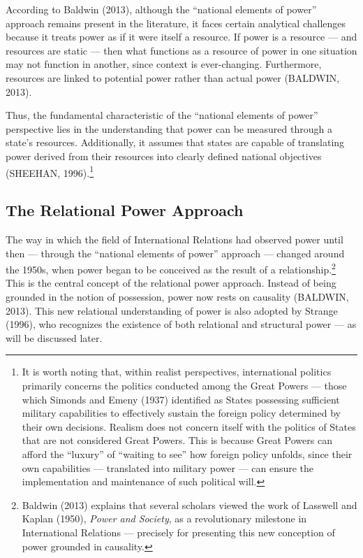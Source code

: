 According to Baldwin (2013), although the “national elements of power” approach remains present in the literature, it faces certain analytical challenges because it treats power as if it were itself a resource. If power is a resource — and resources are static — then what functions as a resource of power in one situation may not function in another, since context is ever-changing. Furthermore, resources are linked to potential power rather than actual power (BALDWIN, 2013).

Thus, the fundamental characteristic of the “national elements of power” perspective lies in the understanding that power can be measured through a state’s resources. Additionally, it assumes that states are capable of translating power derived from their resources into clearly defined national objectives (SHEEHAN, 1996).\footnote{It is worth noting that, within realist perspectives, international politics primarily concerns the politics conducted among the Great Powers --- those which Simonds and Emeny (1937) identified as States possessing sufficient military capabilities to effectively sustain the foreign policy determined by their own decisions. Realism does not concern itself with the politics of States that are not considered Great Powers. This is because Great Powers can afford the ``luxury'' of ``waiting to see'' how foreign policy unfolds, since their own capabilities --- translated into military power --- can ensure the implementation and maintenance of such political will.}


\subsection{The Relational Power Approach}

The way in which the field of International Relations had observed power until then --- through the ``national elements of power'' approach --- changed around the 1950s, when power began to be conceived as the result of a relationship.\footnote{Baldwin (2013) explains that several scholars viewed the work of Lasswell and Kaplan (1950), \textit{Power and Society}, as a revolutionary milestone in International Relations --- precisely for presenting this new conception of power grounded in causality.} This is the central concept of the relational power approach. Instead of being grounded in the notion of possession, power now rests on causality (BALDWIN, 2013). This new relational understanding of power is also adopted by Strange (1996), who recognizes the existence of both relational and structural power --- as will be discussed later.

